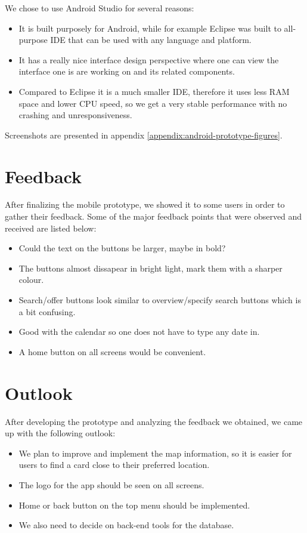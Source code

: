\documentclass[11pt,twoside,a4paper]{report}
\begin{document}
We chose to use Android Studio for several reasons:

\begin{itemize}
\item It is built purposely for Android, while for example Eclipse was built to all-purpose IDE that can be used with any language and platform.
\item It has a really nice interface design perspective where one can view the interface one is are working on and its related components.
\item Compared to Eclipse it is a much smaller IDE, therefore it uses less RAM space and lower CPU speed, so we get a very stable performance with no crashing and unresponsiveness.
\end{itemize}

Screenshots are presented in appendix \ref{appendix:android-prototype-figures}.

\section{Feedback}

After finalizing the mobile prototype, we showed it to some users in order to gather their feedback. Some of the major feedback points that were observed and received are listed below:

\begin{itemize}
\item Could the text on the buttons be larger, maybe in bold?
\item The buttons almost dissapear in bright light, mark them with a sharper colour.
\item Search/offer buttons look similar to overview/specify search buttons which is a bit confusing.
\item Good with the calendar so one does not have to type any date in.
\item A home button on all screens would be convenient.
\end{itemize}

\section{Outlook}

After developing the prototype and analyzing the feedback we obtained, we came up with the following outlook:

\begin{itemize}
\item We plan to improve and implement the map information, so it is easier for users to find a card close to their preferred location.
\item The logo for the app should be seen on all screens.
\item Home or back button on the top menu should be implemented.
\item We also need to decide on back-end tools for the database.
\end{itemize}
\end{document}
